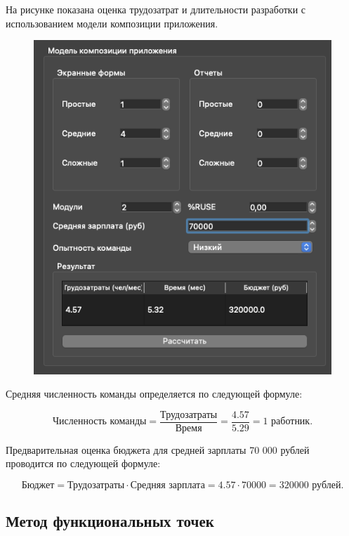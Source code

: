 На рисунке показана оценка трудозатрат и длительности разработки с использованием модели композиции приложения.

\begin{figure}[h!]
	\begin{center}
		\includegraphics[scale=0.5]{inc/img/p_1.png}
	\end{center}
	\captionsetup{justification=centering}
	\label{fig:u3}
\end{figure}

Средняя численность команды определяется по следующей формуле:

$$\text{Численность команды} = \frac{\text{Трудозатраты}}{\text{Время}} =
\frac{4.57}{5.29} = 1 \text{ работник.}$$

Предварительная оценка бюджета для средней зарплаты 70 000 рублей проводится по
следующей формуле:

$$\text{Бюджет} = \text{Трудозатраты} \cdot \text{Средняя зарплата} = 4.57 \cdot
70 000 = 320 000\text{ рублей.}$$


\newpage

\subsection*{Метод функциональных точек}

